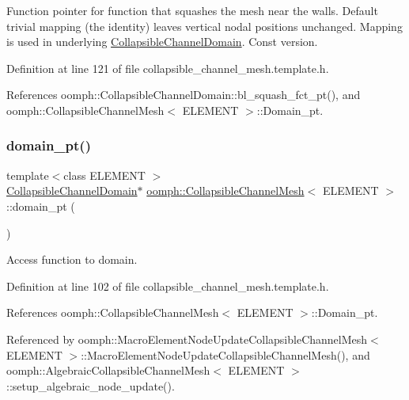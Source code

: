 Function pointer for function that squashes the mesh near the walls. Default trivial mapping (the identity) leaves vertical nodal positions unchanged. Mapping is used in underlying \hyperlink{classoomph_1_1CollapsibleChannelDomain}{Collapsible\+Channel\+Domain}. Const version. 



Definition at line 121 of file collapsible\+\_\+channel\+\_\+mesh.\+template.\+h.



References oomph\+::\+Collapsible\+Channel\+Domain\+::bl\+\_\+squash\+\_\+fct\+\_\+pt(), and oomph\+::\+Collapsible\+Channel\+Mesh$<$ E\+L\+E\+M\+E\+N\+T $>$\+::\+Domain\+\_\+pt.

\mbox{\label{classoomph_1_1CollapsibleChannelMesh_a379365813e6c3566639dc55a971f0b10}} 
\subsubsection{\texorpdfstring{domain\+\_\+pt()}{domain\_pt()}}
{\footnotesize\ttfamily template$<$class E\+L\+E\+M\+E\+NT $>$ \\
\hyperlink{classoomph_1_1CollapsibleChannelDomain}{Collapsible\+Channel\+Domain}$\ast$ \hyperlink{classoomph_1_1CollapsibleChannelMesh}{oomph\+::\+Collapsible\+Channel\+Mesh}$<$ E\+L\+E\+M\+E\+NT $>$\+::domain\+\_\+pt (\begin{DoxyParamCaption}{ }\end{DoxyParamCaption})\hspace{0.3cm}{\ttfamily [inline]}}



Access function to domain. 



Definition at line 102 of file collapsible\+\_\+channel\+\_\+mesh.\+template.\+h.



References oomph\+::\+Collapsible\+Channel\+Mesh$<$ E\+L\+E\+M\+E\+N\+T $>$\+::\+Domain\+\_\+pt.



Referenced by oomph\+::\+Macro\+Element\+Node\+Update\+Collapsible\+Channel\+Mesh$<$ E\+L\+E\+M\+E\+N\+T $>$\+::\+Macro\+Element\+Node\+Update\+Collapsible\+Channel\+Mesh(), and oomph\+::\+Algebraic\+Collapsible\+Channel\+Mesh$<$ E\+L\+E\+M\+E\+N\+T $>$\+::setup\+\_\+algebraic\+\_\+node\+\_\+update().

